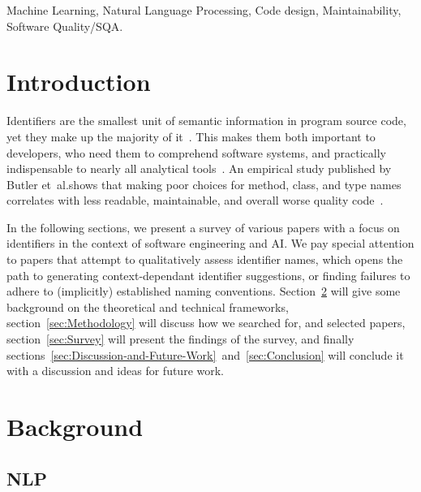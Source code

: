 \documentclass[conference]{IEEEtran}
\begin{document}
\begin{IEEEkeywords}
Machine Learning, Natural Language Processing, Code design, Maintainability, Software
Quality/SQA.
\end{IEEEkeywords}

\section{Introduction}
\label{sec:Introduction}

Identifiers are the smallest unit of semantic information in program source code, yet they
make up the majority of it~\cite{Butler2010Empirical}. This makes them both important to
developers, who need them to comprehend software systems,  and practically indispensable
to nearly all analytical tools~\cite{Gao2019IdentGen}. An empirical study published by
Butler et~al.\@ shows that making poor choices for method, class, and type names
correlates with less readable, maintainable, and overall worse quality
code~\cite{Butler2010Empirical}.

In the following sections, we present a survey of various papers with a focus on
identifiers in the context of software engineering and \acs{AI}. We pay special attention
to papers that attempt to qualitatively assess identifier names, which opens the path to
generating context-dependant identifier suggestions, or finding failures to adhere to
(implicitly) established naming conventions. Section~\ref{sec:Background} will give some
background on the theoretical and technical frameworks, section~\ref{sec:Methodology} will
discuss how we searched for, and selected papers, section~\ref{sec:Survey} will present
the findings of the survey, and finally
sections~\ref{sec:Discussion-and-Future-Work}~and~\ref{sec:Conclusion} will conclude it
with a discussion and ideas for future work.


\section{Background}
\label{sec:Background}

\subsection{\acl{NLP}}
\label{ssec:Natural-Language-Processing}
\end{document}
